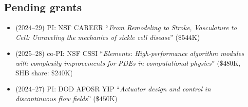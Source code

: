 \subsection{Pending grants}

\begin{itemize}
    \item (2024--29) PI: NSF CAREER ``\textit{From Remodeling to Stroke, Vasculature to Cell: Unraveling the mechanics of sickle cell disease}'' ($\$544$K)
    \item (2025--28) co-PI: NSF CSSI ``\textit{Elements: High-performance algorithm modules with complexity improvements for PDEs in computational physics}'' ($\$480$K, SHB share: $\$240$K)
    \item (2024--27) PI: DOD AFOSR YIP ``\textit{Actuator design and control in discontinuous flow fields}'' ($\$450$K)
\end{itemize}
